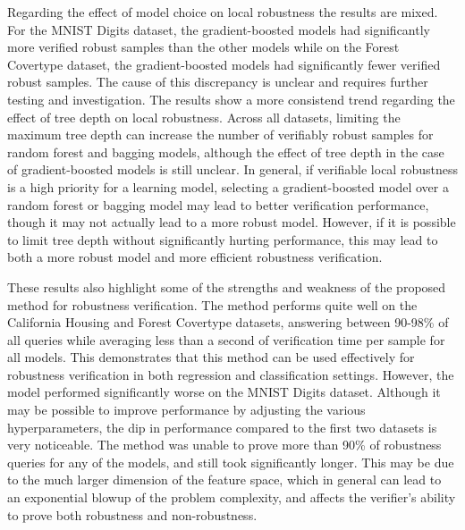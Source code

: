 \documentclass[pageno]{jpaper}
\begin{document}
\begin{doublespacing}
Regarding the effect of model choice on local robustness the results are mixed. For the MNIST Digits dataset, the gradient-boosted models had significantly more verified robust samples than the other models while on the Forest Covertype dataset, the gradient-boosted models had significantly fewer verified robust samples. The cause of this discrepancy is unclear and requires further testing and investigation. The results show a more consistend trend regarding the effect of tree depth on local robustness. Across all datasets, limiting the maximum tree depth can increase the number of verifiably robust samples for random forest and bagging models, although the effect of tree depth in the case of gradient-boosted models is still unclear. In general, if verifiable local robustness is a high priority for a learning model, selecting a gradient-boosted model over a random forest or bagging model may lead to better verification performance, though it may not actually lead to a more robust model. However, if it is possible to limit tree depth without significantly hurting performance, this may lead to both a more robust model and more efficient robustness verification.

These results also highlight some of the strengths and weakness of the proposed method for robustness verification. The method performs quite well on the California Housing and Forest Covertype datasets, answering between 90-98\% of all queries while averaging less than a second of verification time per sample for all models. This demonstrates that this method can be used effectively for robustness verification in both regression and classification settings. However, the model performed significantly worse on the MNIST Digits dataset. Although it may be possible to improve performance by adjusting the various hyperparameters, the dip in performance compared to the first two datasets is very noticeable. The method was unable to prove more than 90\% of robustness queries for any of the models, and still took significantly longer. This may be due to the much larger dimension of the feature space, which in general can lead to an exponential blowup of the problem complexity, and affects the verifier's ability to prove both robustness and non-robustness.


\end{doublespacing}
\end{document}
